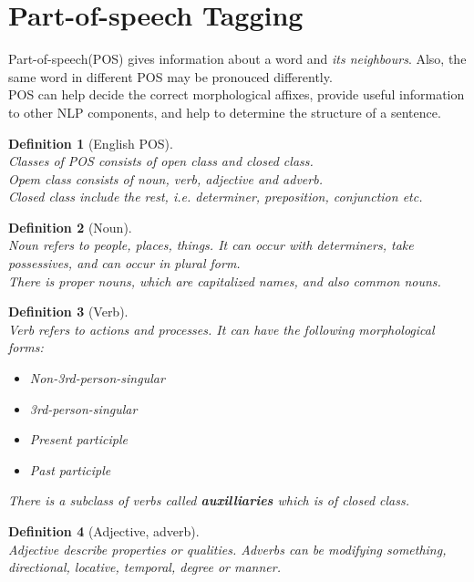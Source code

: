 \documentclass[12pt]{article}
\newtheorem{definition}{Definition}[section]
\theoremstyle{definition}
\begin{document}
\section{Part-of-speech Tagging}
Part-of-speech(POS) gives information about a word and \textit{its neighbours}. Also, the same word in different POS may be pronouced differently.\\
POS can help decide the correct morphological affixes, provide useful information to other NLP components, and help to determine the structure of a sentence.\\
\begin{definition}[English POS]
\hfill\\\normalfont Classes of POS consists of open class and closed class.\\
Opem class consists of noun, verb, adjective and adverb.\\
Closed class include the rest, i.e. determiner, preposition, conjunction etc.
\end{definition}
\begin{definition}[Noun]
\hfill\\\normalfont Noun refers to people, places, things. It can occur with determiners, take possessives, and can occur in plural form.\\
There is proper nouns, which are capitalized names, and also common nouns.
\end{definition}
\begin{definition}[Verb]
\hfill\\\normalfont Verb refers to actions and processes. It can have the following morphological forms:
\begin{itemize}
	\item Non-3rd-person-singular
	\item 3rd-person-singular
	\item Present participle
	\item Past participle
\end{itemize}
There is a subclass of verbs called \textbf{auxilliaries} which is of closed class.
\end{definition}
\begin{definition}[Adjective, adverb]
\hfill\\\normalfont Adjective describe properties or qualities. Adverbs can be modifying something, directional, locative, temporal, degree or manner.
\end{definition}
\end{document}
